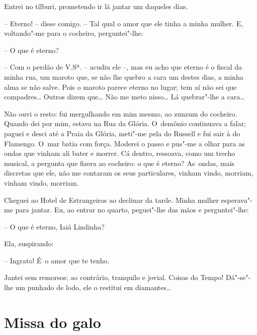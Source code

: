 Entrei no tílburi, prometendo ir lá jantar um daqueles dias.

-- Eterno! -- disse comigo. -- Tal qual o amor que ele tinha a minha
mulher. E, voltando"-me para o cocheiro, perguntei"-lhe:

-- O que é eterno?

-- Com o perdão de V.Sª. -- acudiu ele --, mas eu acho que eterno é o
fiscal da minha rua, um maroto que, se não lhe quebro a cara um destes
dias, a minha alma se não salve. Pois o maroto parece eterno no lugar;
tem aí não sei que compadres\ldots{} Outros dizem que\ldots{} Não me meto nisso\ldots{}
Lá quebrar"-lhe a cara\ldots{}

Não ouvi o resto: fui mergulhando em mim mesmo, ao zunzum do cocheiro.
Quando dei por mim, estava na Rua da Glória. O~demônio continuava a
falar; paguei e desci até a Praia da Glória, meti"-me pela do Russell e
fui sair à do Flamengo. O~mar batia com força. Moderei o passo e pus"-me
a olhar para as ondas que vinham ali bater e morrer. Cá dentro,
ressoava, como um trecho musical, a pergunta que fizera ao cocheiro: o
que é eterno? As~ondas, mais discretas que ele, não me contaram os seus
particulares, vinham vindo, morriam, vinham vindo, morriam.

Cheguei ao Hotel de Estrangeiros ao declinar da tarde. Minha mulher
esperava"-me para jantar. Eu, ao entrar no quarto, peguei"-lhe das mãos e
perguntei"-lhe:

-- O que é eterno, Iaiá Lindinha?

Ela, suspirando:

-- Ingrato! É~o amor que te tenho.

Jantei sem remorsos; ao contrário, tranquilo e jovial. Coisas do Tempo!
Dá"-se"-lhe um punhado de lodo, ele o restitui em diamantes\ldots{}

\chapter{Missa do galo}

